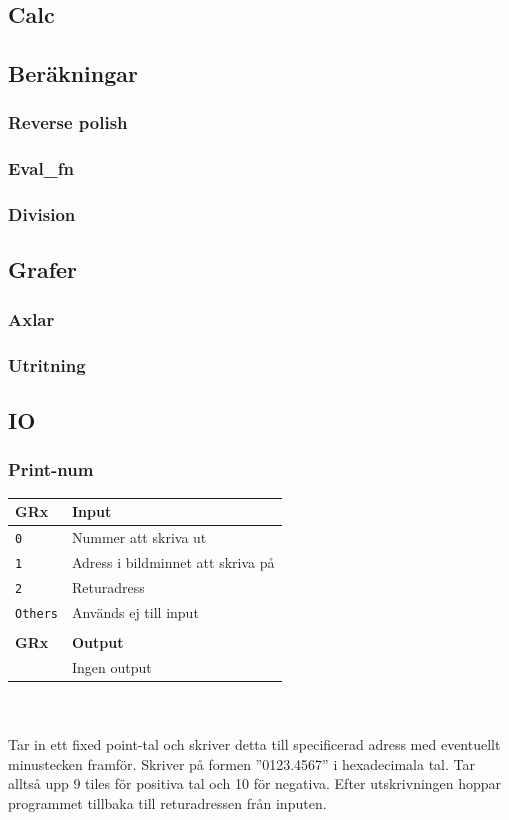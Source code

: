 \documentclass[]{article}
\begin{document}
\subsection{Calc}

\subsection{Beräkningar}
\subsubsection{Reverse polish}
\subsubsection{Eval\_fn}
\subsubsection{Division}

\subsection{Grafer}
\subsubsection{Axlar}
\subsubsection{Utritning}

\subsection{IO}
\subsubsection{Print-num}
\begin{tabular}{ll}
	\textbf{GRx}    & \textbf{Input}                    \\ \hline
	\texttt{0}      & Nummer att skriva ut              \\
	\texttt{1}      & Adress i bildminnet att skriva på \\
	\texttt{2}      & Returadress                       \\
	\texttt{Others} & Används ej till input             \\
	                &  \\
	\textbf{GRx}    & \textbf{Output}                   \\ \hline
	                & Ingen output 						\\
\end{tabular}
\\\\
\noindent
Tar in ett fixed point-tal och skriver detta till specificerad adress med eventuellt minustecken framför. Skriver på formen ''0123.4567'' i hexadecimala tal. Tar alltså upp 9 tiles för positiva tal och 10 för negativa. Efter utskrivningen hoppar programmet tillbaka till returadressen från inputen.
\end{document}
